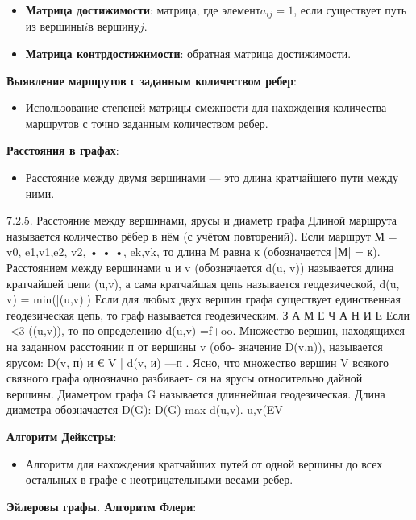 \documentclass[
]{article}
\providecommand{\tightlist}{%
  \setlength{\itemsep}{0pt}\setlength{\parskip}{0pt}}
\begin{document}
\begin{enumerate}
{{{{{  \begin{itemize}
  \tightlist
  \item
    \textbf{Матрица достижимости}: матрица, где элемент\(a_{ij} = 1\),
    если существует путь из вершины\(i\)в вершину\(j\).
  \item
    \textbf{Матрица контрдостижимости}: обратная матрица достижимости.
  \end{itemize}
\item
  \textbf{Выявление маршрутов с заданным количеством ребер}:

  \begin{itemize}
  \tightlist
  \item
    Использование степеней матрицы смежности для нахождения количества
    маршрутов с точно заданным количеством ребер.
  \end{itemize}
\item
  \textbf{Расстояния в графах}:

  \begin{itemize}
  \tightlist
  \item
    Расстояние между двумя вершинами --- это длина кратчайшего пути
    между ними.
  \end{itemize}
7.2.5. Расстояние между вершинами, ярусы
и диаметр графа
Длиной маршрута называется количество рёбер в нём (с учётом повторений).
Если маршрут М = v0, e1,v1,e2, v2, • • •, ek,vk, то длина М равна к (обозначается
|М| = к). Расстоянием между вершинами u и v (обозначается d(u, v)) называется
длина кратчайшей цепи (u,v), а сама кратчайшая цепь называется геодезической,
d(u, v)  = min(|(u,v)|)
Если для любых двух вершин графа существует единственная геодезическая
цепь, то граф называется геодезическим.
З А М Е Ч А Н И Е
Если -<3 ((u,v)), то по определению d(u,v) =f+oo.
Множество вершин, находящихся на заданном расстоянии п от вершины v (обо-
значение D(v,n)), называется ярусом:
D(v, п) {и € V | d(v, и) —п} .
Ясно, что множество вершин V всякого связного графа однозначно разбивает-
ся на ярусы относительно дайной вершины. Диаметром графа G называется
длиннейшая геодезическая. Длина диаметра обозначается D(G):
D(G) max d(u,v).
u,v(EV
\item
  \textbf{Алгоритм Дейкстры}:

  \begin{itemize}
  \tightlist
  \item
    Алгоритм для нахождения кратчайших путей от одной вершины до всех
    остальных в графе с неотрицательными весами ребер.
  \end{itemize}
\item
  \textbf{Эйлеровы графы. Алгоритм Флери}:

}}}}}
\end{enumerate}
\end{document}
